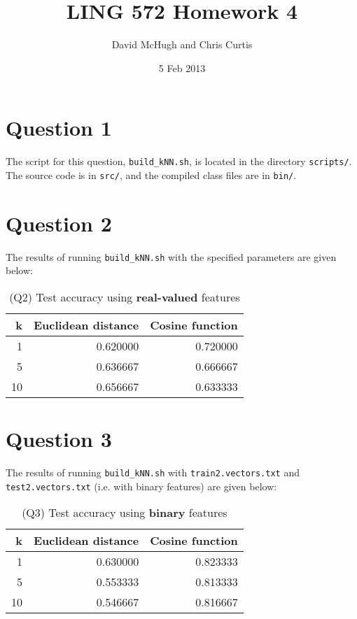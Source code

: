 \documentclass[oneside,justified,marginals=raggedouter]{tufte-handout}
\title{LING 572 Homework 4}
\author{David McHugh and Chris Curtis}
\date{5 Feb 2013}
\begin{document}
\maketitle


\section{Question 1}

The script for this question, \texttt{build\_kNN.sh}, is located in the
directory \texttt{scripts/}. The source code is in \texttt{src/}, and the
compiled class files are in \texttt{bin/}.

\section{Question 2}

The results of running \texttt{build\_kNN.sh} with the specified
parameters are given below:

\begin{table}[h]
\begin{tabular}{@{}rrr@{}}
\toprule
k & Euclidean distance & Cosine function \\ \midrule
1 & 0.620000 & 0.720000 \\
5 & 0.636667 & 0.666667 \\
10 & 0.656667 & 0.633333 \\
\bottomrule
\end{tabular}
\caption{(Q2) Test accuracy using {\bf real-valued} features}
\end{table}

\section{Question 3}

The results of running \texttt{build\_kNN.sh} with \texttt{train2.vectors.txt}
and \texttt{test2.vectors.txt} (i.e. with binary features) are given below:

\begin{table}[h]
\begin{tabular}{@{}rrr@{}}
\toprule
k & Euclidean distance & Cosine function \\ \midrule
1 & 0.630000 & 0.823333 \\
5 & 0.553333 & 0.813333 \\
10 & 0.546667 & 0.816667 \\
\bottomrule
\end{tabular}
\caption{(Q3) Test accuracy using {\bf binary} features}
\end{table}
\end{document}
